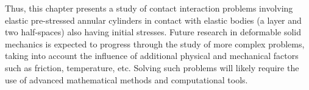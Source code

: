 Thus, this chapter presents a study of contact interaction problems involving elastic pre-stressed annular cylinders in contact with elastic bodies (a layer and two half-spaces) also having initial stresses. Future research in deformable solid mechanics is expected to progress through the study of more complex problems, taking into account the influence of additional physical and mechanical factors such as friction, temperature, etc. Solving such problems will likely require the use of advanced mathematical methods and computational tools.




